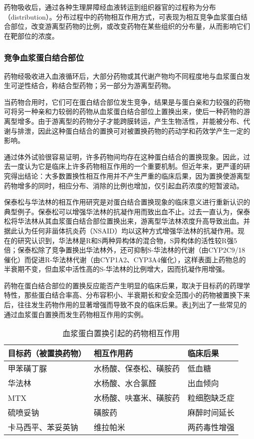 药物吸收后，通过各种生理屏障经血液转运到组织器官的过程称为分布（distribution）。分布过程中的药物相互作用方式，可表现为相互竞争血浆蛋白结合部位，改变游离型药物的比例，或改变药物在某些组织的分布量，从而影响它们在靶部位的浓度。

\subsubsection{竞争血浆蛋白结合部位}

药物经吸收进入血液循环后，大部分药物或其代谢产物均不同程度地与血浆蛋白发生可逆性结合，称结合型药物；另一部分为游离型药物。

当药物合用时，它们可在蛋白结合部位发生竞争，结果是与蛋白亲和力较强的药物可将另一种亲和力较弱的药物从血浆蛋白结合部位上置换出来，使后一种药物的游离型增多。由于游离型的药物分子才能跨膜转运，产生生物活性，并能被分布、代谢与排泄，因此这种蛋白结合的置换可对被置换药物的药动学和药效学产生一定的影响。

通过体外试验很容易证明，许多药物间均存在这种蛋白结合的置换现象。因此，过去一度认为它是临床上许多药物相互作用的一个重要机制。但近年来，更严谨的研究得出结论：大多数置换性相互作用并不产生严重的临床后果，因为置换使游离型药物增多的同时，相应分布、消除的比例也增加，仅引起血药浓度的短暂波动。

保泰松与华法林的相互作用研究是对蛋白结合置换现象的临床意义进行重新认识的典型例子。保泰松可以增强华法林的抗凝作用而致出血不止。过去一直认为，保泰松将华法林从其血浆蛋白结合部位置换出来，游离型华法林浓度升高导致出血。并据此认为任何非甾体抗炎药（NSAID）均以这种方式增强华法林的抗凝作用。现在的研究认识到，华法林是R和S两种异构体的混合物，S异构体的活性较R强5倍；保泰松除了竞争置换出华法林外，还可抑制S-华法林的代谢（由CYP2C9/18催化）而促进R-华法林代谢（由CYP1A2、CYP3A4催化），这样表面上药物总的半衰期不变，但血浆中活性高的S-华法林的比例增大，因而抗凝作用增强。

药物在蛋白结合部位的置换反应能否产生明显的临床后果，取决于目标药的药理学特性，那些蛋白结合率高、分布容积小、半衰期长和安全范围小的药物被置换下来后，往往发生药物作用的显著增强而导致不良的临床后果。表\ref{tab4-1}列出了一些常见的通过血浆蛋白置换而发生药物相互作用的实例。

\begin{longtable}[]{@{}lll@{}}
    \caption{血浆蛋白置换引起的药物相互作用}
    \label{tab4-1}\\
    \toprule
目标药（被置换药物） & 相互作用药 & 临床后果\tabularnewline
\midrule
甲苯磺丁脲 & 水杨酸、保泰松、磺胺药 & 低血糖\tabularnewline
华法林 & 水杨酸、水合氯醛 & 出血倾向\tabularnewline
MTX & 水杨酸、呋塞米、磺胺药 & 粒细胞缺乏症\tabularnewline
硫喷妥钠 & 磺胺药 & 麻醉时间延长\tabularnewline
卡马西平、苯妥英钠 & 维拉帕米 & 两药毒性增强\tabularnewline
\bottomrule
\end{longtable}

